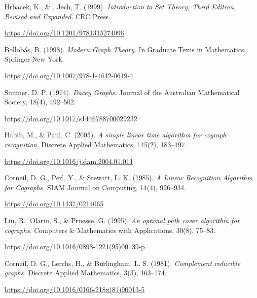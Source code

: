 
\begin{thebibliography}{99}

     Hrbacek, K., \& , Jech, T. (1999).
    \textit{Introduction to Set Theory, Third Edition, Revised and Expanded.} CRC Press.

    \url{https://doi.org/10.1201/9781315274096}

     Bollobás, B. (1998).
    \textit{Modern Graph Theory.}
    In Graduate Texts in Mathematics. Springer New York.

    \url{https://doi.org/10.1007/978-1-4612-0619-4}

     Sumner, D. P. (1974).
    \textit{Dacey Graphs.}
    Journal of the Australian Mathematical Society, 18(4), 492–502.

    \url{https://doi.org/10.1017/s1446788700029232}

     Habib, M., \& Paul, C. (2005).
    \textit{A simple linear time algorithm for cograph recognition.}
    Discrete Applied Mathematics, 145(2), 183–197.

    \url{https://doi.org/10.1016/j.dam.2004.01.011}

     Corneil, D. G., Perl, Y., \& Stewart, L. K. (1985).
    \textit{A Linear Recognition Algorithm for Cographs.}
    SIAM Journal on Computing, 14(4), 926–934.

    \url{https://doi.org/10.1137/0214065}

     Lin, R., Olariu, S., \& Pruesse, G. (1995).
    \textit{An optimal path cover algorithm for cographs.}
    Computers \& Mathematics with Applications, 30(8), 75–83.

    \url{https://doi.org/10.1016/0898-1221(95)00139-p}

     Corneil, D. G., Lerchs, H., \& Burlingham, L. S. (1981).
    \textit{Complement reducible graphs.}
    Discrete Applied Mathematics, 3(3), 163–174.

    \url{https://doi.org/10.1016/0166-218x(81)90013-5}

\end{thebibliography}
